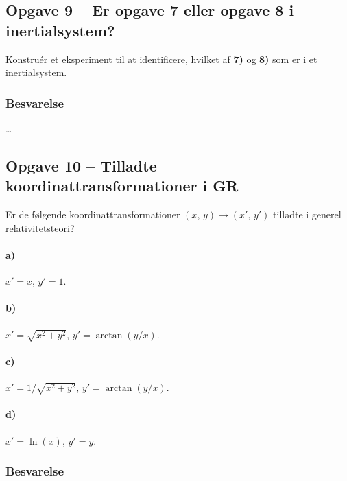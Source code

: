 \documentclass[../main.tex]{subfiles}
\begin{document}

\subsection{Opgave 9 -- Er opgave 7 eller opgave 8 i inertialsystem?}
\setcounter{subsection}{9}
\setcounter{equation}{0}

Konstruér et eksperiment til at identificere, hvilket af \textbf{7)} og \textbf{8)} som er i et inertialsystem.


\subsubsection{Besvarelse}

\ldots




\subsection{Opgave 10 -- Tilladte koordinattransformationer i GR}
\setcounter{subsection}{10}
\setcounter{equation}{0}

Er de følgende koordinattransformationer $(x,\, y) \rightarrow (x',\, y')$ tilladte i generel relativitetsteori?
\paragraph{a)} $x' = x$, $y' = 1$.
\paragraph{b)} $x' = \sqrt{x^2 + y^2}$, $y' = \arctan(y/x)$.
\paragraph{c)} $x' = 1/\sqrt{x^2 + y^2}$, $y' = \arctan(y/x)$.
\paragraph{d)} $x' = \ln(x)$, $y' = y$.


\subsubsection*{Besvarelse}
\end{document}
